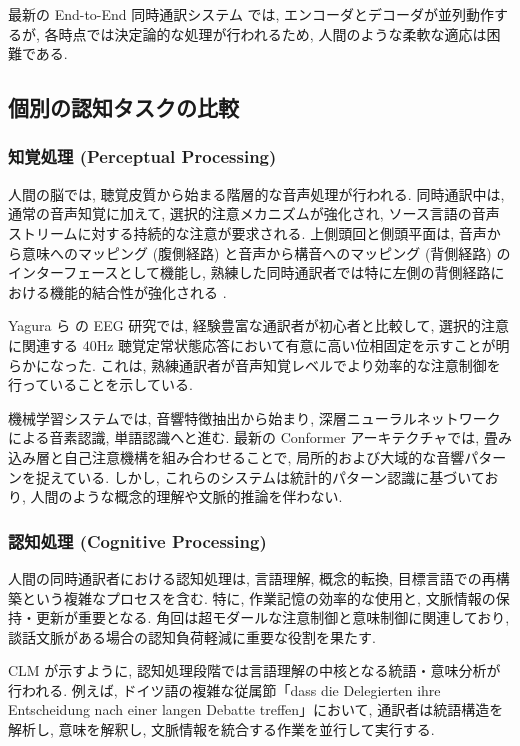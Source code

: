 最新の End-to-End 同時通訳システム \cite{ma2024nast, zhang2024streamspeech} では, エンコーダとデコーダが並列動作するが, 各時点では決定論的な処理が行われるため, 人間のような柔軟な適応は困難である.

\subsection{個別の認知タスクの比較}

\subsubsection{知覚処理 (Perceptual Processing)}

人間の脳では, 聴覚皮質から始まる階層的な音声処理が行われる.
同時通訳中は, 通常の音声知覚に加えて, 選択的注意メカニズムが強化され, ソース言語の音声ストリームに対する持続的な注意が要求される.
上側頭回と側頭平面は, 音声から意味へのマッピング (腹側経路) と音声から構音へのマッピング (背側経路) のインターフェースとして機能し, 熟練した同時通訳者では特に左側の背側経路における機能的結合性が強化される \cite{elmer2016functional} .

Yagura ら \cite{yagura2021selective} の EEG 研究では, 経験豊富な通訳者が初心者と比較して, 選択的注意に関連する 40Hz 聴覚定常状態応答において有意に高い位相固定を示すことが明らかになった.
これは, 熟練通訳者が音声知覚レベルでより効率的な注意制御を行っていることを示している.

機械学習システムでは, 音響特徴抽出から始まり, 深層ニューラルネットワークによる音素認識, 単語認識へと進む.
最新の Conformer アーキテクチャでは, 畳み込み層と自己注意機構を組み合わせることで, 局所的および大域的な音響パターンを捉えている.
しかし, これらのシステムは統計的パターン認識に基づいており, 人間のような概念的理解や文脈的推論を伴わない.

\subsubsection{認知処理 (Cognitive Processing)}

人間の同時通訳者における認知処理は, 言語理解, 概念的転換, 目標言語での再構築という複雑なプロセスを含む.
特に, 作業記憶の効率的な使用と, 文脈情報の保持・更新が重要となる.
角回は超モダールな注意制御と意味制御に関連しており, 談話文脈がある場合の認知負荷軽減に重要な役割を果たす.

CLM が示すように, 認知処理段階では言語理解の中核となる統語・意味分析が行われる.
例えば, ドイツ語の複雑な従属節「dass die Delegierten ihre Entscheidung nach einer langen Debatte treffen」において, 通訳者は統語構造を解析し, 意味を解釈し, 文脈情報を統合する作業を並行して実行する.


